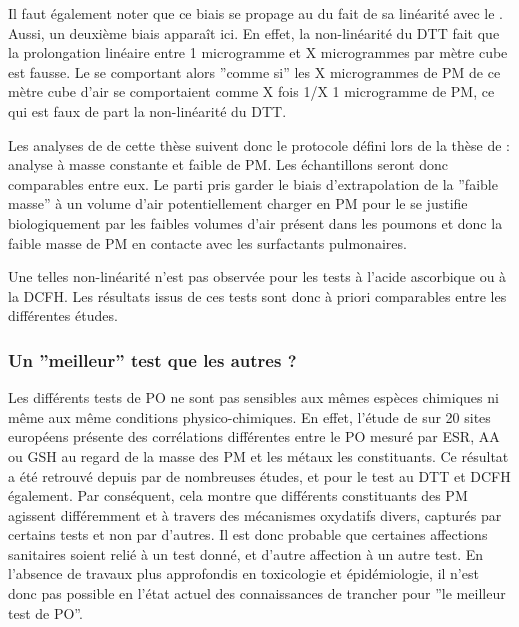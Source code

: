 Il faut également noter que ce biais se propage au \PODTTv{} du fait de sa linéarité avec le
\PODTTm. Aussi, un deuxième biais apparaît ici. En effet, la non-linéarité du DTT fait
que la prolongation linéaire entre 1 microgramme et X microgrammes par mètre cube est
fausse. Le \PODTTv{} se comportant alors ''comme si'' les X microgrammes de PM de ce mètre
cube d'air se comportaient comme X fois 1/X 1 microgramme de PM, ce qui est faux de part
la non-linéarité du DTT.

Les analyses de \PODTT{} de cette thèse suivent donc le protocole défini lors de la thèse
de \textcite{calasPollution2017} : analyse à masse constante et faible de PM. Les
échantillons seront donc comparables entre eux. Le parti pris garder le biais
d'extrapolation de la ''faible masse'' à un volume d'air potentiellement charger en PM
pour le \PODTTv{} se justifie biologiquement par les faibles volumes d'air présent dans les
poumons et donc la faible masse de PM en contacte avec les surfactants pulmonaires.

Une telles non-linéarité n'est pas observée pour les tests à l'acide ascorbique ou à la
DCFH.
Les résultats issus de ces tests sont donc à priori comparables entre les différentes
études.

%


\subsubsection{Un ''meilleur'' test que les autres ?}%
\label{ssub:un_meilleur_test_que_les_autres_}

Les différents tests de PO ne sont pas sensibles aux mêmes espèces chimiques ni même aux même
conditions physico-chimiques. En effet, l'étude de \textcite{kunzliComparison2006} sur 20
sites européens présente des corrélations différentes entre le PO mesuré par ESR, AA ou
GSH au regard de la masse des PM et les métaux les constituants.
Ce résultat a été retrouvé depuis par de nombreuses études, et pour le test au DTT et DCFH
également. Par conséquent, cela montre que différents constituants des PM agissent
différemment et à travers des mécanismes oxydatifs divers, capturés par certains tests et
non par d'autres.
Il est donc probable que certaines affections sanitaires soient relié à un test donné, et
d'autre affection à un autre test. En l'absence de travaux plus approfondis en toxicologie
et épidémiologie, il n'est donc pas possible en l'état actuel des connaissances de trancher
pour ''le meilleur test de PO''.

